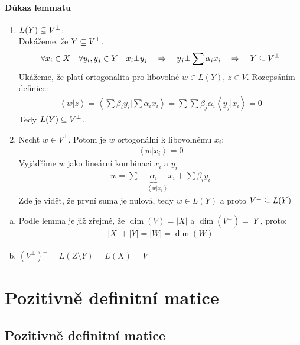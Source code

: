 \documentclass[a4paper,10pt]{article}
\begin{document}
\paragraph{Důkaz lemmatu}
\begin{enumerate}
	\item $L(Y) \subseteq V^\bot$: \\
		Dokážeme, že $Y \subseteq V^\bot$.
		\begin{align}
			\forall x_i \in X \quad \forall y_i, y_j \in Y \quad x_i \bot y_j
			\quad \Rightarrow \quad y_j \bot \sum \alpha_i x_i \quad \Rightarrow
			\quad Y \subseteq V^\bot
		\end{align}
		Ukážeme, že platí ortogonalita pro libovolné $w \in L(Y)$, $z \in V$.
		Rozepsáním definice:
		\begin{align}
			\left< w | z \right> = \left < \sum \beta_i y_i \Big| \sum \alpha_i
			x_i \right> = \sum \sum \beta_j \alpha_i \left< y_j | x_i\right> = 0
		\end{align}
		Tedy $L(Y) \subseteq V^\bot$.
	\item Nechť $w \in V^\bot$. Potom je $w$ ortogonální k libovolnému $x_i$:
		\begin{align}
			\left< w | x_i \right> = 0
		\end{align}
		Vyjádříme $w$ jako lineární kombinaci $x_i$	a $y_i$
		\begin{align}
			w = \sum \underbrace{\alpha_i}_{=\left<w|x_i\right>} x_i + \sum \beta_i y_i
		\end{align}
		Zde je vidět, že první suma je nulová, tedy $w \in L(Y)$ a proto 
		$V^\bot	\subseteq L(Y)$
\end{enumerate}
\begin{enumerate}[c)]
	\item Podle lemma je již zřejmé, že $\dim(V) = |X|$ a $\dim(V^\bot) = |Y|$,
	proto:
	\begin{align}
		|X| + |Y| = |W| = \dim(W)
	\end{align}
	\item $(V^\bot)^\bot = L(Z \setminus Y) = L(X) = V$
\end{enumerate}

\section{Pozitivně definitní matice}
\setcounter{equation}{0}
\subsection{Pozitivně definitní matice}
\setcounter{equation}{0}
\end{document}

